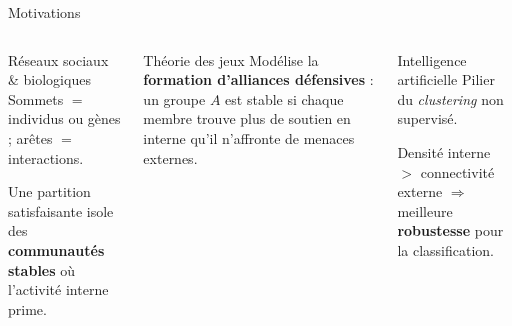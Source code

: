 \begin{frame}{Motivations}
  \begin{columns}[T]
    \begin{alertblock}{R\'eseaux sociaux \& biologiques}
      Sommets $=$ individus ou g\`enes ; ar\^etes $=$ interactions.

      \smallskip
      Une partition satisfaisante isole des \textbf{communaut\'es stables} o\`u l'activit\'e interne prime.
    \end{alertblock}

    \begin{alertblock}{Th\'eorie des jeux}
      Mod\'elise la \textbf{formation d'alliances d\'efensives} : un groupe $A$ est stable si chaque membre trouve plus de soutien en interne qu'il n'affronte de menaces externes.
    \end{alertblock}

    \begin{alertblock}{Intelligence artificielle}
      Pilier du \textit{clustering} non supervis\'e.

      \smallskip
      Densit\'e interne $>$ connectivit\'e externe $\Rightarrow$ meilleure \textbf{robustesse} pour la classification.
    \end{alertblock}
  \end{columns}
\end{frame}

